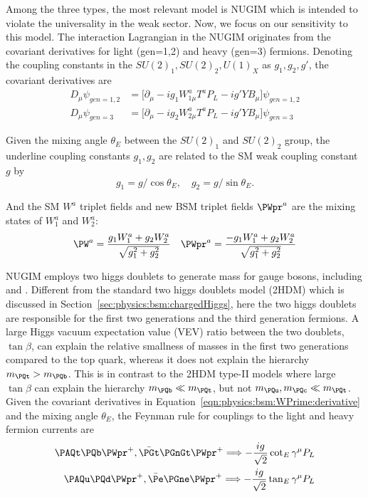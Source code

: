Among the three types, the most relevant model is NUGIM which is intended to violate the universality in the weak sector. Now, we focus on our sensitivity to this model. The interaction Lagrangian in the NUGIM originates from the covariant derivatives for light (gen=1,2) and heavy (gen=3) fermions. Denoting the coupling constants in the $SU(2)_1 , SU(2)_2, U(1)_X$ as $g_1, g_2, g'$, the covariant derivatives are
\begin{equation}
\begin{split}
	D_\mu \psi_{gen=1,2} &= \big[ \partial_\mu -ig_1W^a_{1\mu} T^a P_L - ig'YB_\mu\big] \psi_{gen=1,2}  \\
    D_\mu \psi_{gen=3} &= \big[ \partial_\mu -ig_2W^a_{2\mu} T^a P_L - ig'YB_\mu\big] \psi_{gen=3} 
\end{split}
\label{eqn:physics:bsm:WPrime:derivative}
\end{equation}

\noindent Given the mixing angle $\theta_E$ between the $SU(2)_1$ and $SU(2)_2$ group, the underline coupling constants $g_1, g_2$ are related to the SM weak coupling constant $g$ by
\begin{equation}
	g_1=g/ \cos \theta_E, \quad g_2=g/ \sin \theta_E.
\end{equation}

\noindent And the SM $W^a$ triplet fields and new BSM triplet fields $\PWpr^a$  are the mixing states of $W_1^a$ and $W_2^a$:
\begin{equation}
	\PW^a = \frac{g_1 W^a_1 + g_2 W_2^a}{\sqrt{g_1^2+g_2^2}} \quad \PWpr^a = \frac{-g_1 W^a_1 + g_2 W_2^a}{\sqrt{g_1^2+g_2^2}}
\end{equation}

\noindent NUGIM employs two higgs doublets to generate mass for gauge bosons, including \PW and \PWpr. Different from the standard two higgs doublets model (2HDM) which is discussed in Section~\ref{sec:physics:bsm:chargedHiggs}, here the two higgs doublets are responsible for the first two generations and the third generation fermions. A large Higgs vacuum expectation value (VEV)  ratio between the two doublets, $\tan \beta$, can explain the relative smallness of masses in the first two generations compared to the top quark, whereas it does not explain the hierarchy $m_\PQt > m_\PQb$. This is in contrast to the 2HDM type-II models where large $\tan \beta$ can explain the hierarchy $m_\PQb\ll m_\PQt$, but not $m_\PQu, m_\PQc  \ll m_\PQt$. Given the covariant derivatives in Equation~\ref{eqn:physics:bsm:WPrime:derivative} and the mixing angle $\theta_E$, the Feynman rule for \PWpr couplings \cite{Edelhauser:2014yra} to the light and heavy fermion currents are 
\begin{equation}
\begin{split}
	\PAQt  \PQb \PWpr^+ , \bar{\PGt} \PGnGt \PWpr^+ \Longrightarrow -\frac{i g}{\sqrt{2}} \cot_E \gamma^\mu P_L \\
    \PAQu \PQd \PWpr^+ , \bar{\Pe} \PGne \PWpr^+ \Longrightarrow -\frac{i g}{\sqrt{2}} \tan_E \gamma^\mu P_L
\end{split}
\label{eqn:physics:bsm:WPrime:feynmanRule}
\end{equation}

